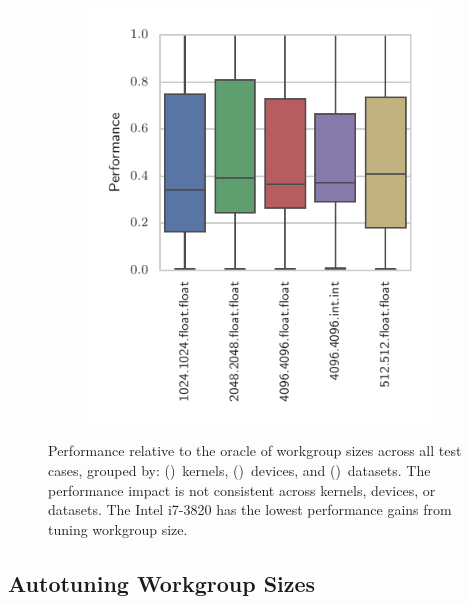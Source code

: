 \documentclass[nonatbib,preprint,9pt]{sigplanconf}
\begin{document}
\begin{figure}
\begin{subfigure}[h]{.48\columnwidth}
    \vspace{-1.5em} %
    \caption{}
    \label{fig:performance-devices}
  \end{subfigure}
  ~%
  \begin{subfigure}[h]{.48\columnwidth}
    \centering
    \includegraphics[width=\columnwidth]{img/performance_datasets.pdf}
    \vspace{-1.5em} %
    \caption{}
    \label{fig:performance-datasets}
  \end{subfigure}
  \caption{%
    Performance relative to the oracle of workgroup sizes across all
    test cases, grouped by:
    ()~kernels,
    ()~devices, and
    ()~datasets. The performance
    impact is not consistent across kernels, devices, or datasets. The
    Intel i7-3820 has the lowest performance gains from tuning
    workgroup size.%
  }
  \label{fig:performances}
\end{figure}

\subsection{Autotuning Workgroup Sizes}
\end{document}
